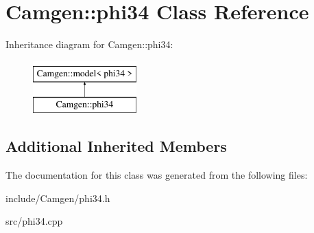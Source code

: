 \hypertarget{a00419}{\section{Camgen\-:\-:phi34 Class Reference}
\label{a00419}
}
Inheritance diagram for Camgen\-:\-:phi34\-:\begin{figure}[H]
\begin{center}
\leavevmode
\includegraphics[height=2.000000cm]{a00419}
\end{center}
\end{figure}
\subsection*{Additional Inherited Members}


The documentation for this class was generated from the following files\-:\begin{DoxyCompactItemize}
\item 
include/\-Camgen/phi34.\-h\item 
src/phi34.\-cpp\end{DoxyCompactItemize}
